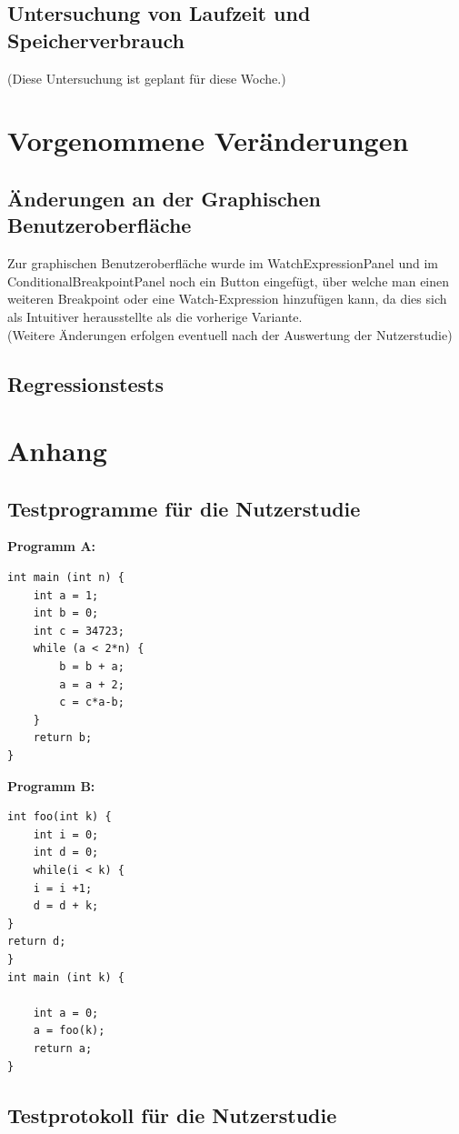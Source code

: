 \documentclass[parskip=full]{scrartcl}
\begin{document}
\subsection{Untersuchung von Laufzeit und Speicherverbrauch}
(Diese Untersuchung ist geplant für diese Woche.)

\section{Vorgenommene Veränderungen}

\subsection{Änderungen an der Graphischen Benutzeroberfläche}
Zur graphischen Benutzeroberfläche wurde im WatchExpressionPanel und im ConditionalBreakpointPanel noch ein Button eingefügt, über welche man einen weiteren Breakpoint oder eine Watch-Expression hinzufügen kann, da dies sich als Intuitiver herausstellte als die vorherige Variante. \\
(Weitere Änderungen erfolgen eventuell nach der Auswertung der Nutzerstudie)

\subsection{Regressionstests}

\newpage
\section{Anhang}
\subsection{Testprogramme für die Nutzerstudie}\label{code}
\textbf{Programm A:}
\begin{verbatim}
int main (int n) {
	int a = 1;
	int b = 0;
	int c = 34723;
	while (a < 2*n) {
		b = b + a;
		a = a + 2;
		c = c*a-b;
	}
	return b;
}
\end{verbatim}

\textbf{Programm B:}
\begin{verbatim}
int foo(int k) {
	int i = 0;
	int d = 0;
	while(i < k) {
	i = i +1;
	d = d + k;
}
return d;
}
int main (int k) {

	int a = 0;
	a = foo(k);
	return a;
}
\end{verbatim}

\subsection{Testprotokoll für die Nutzerstudie}\label{usertest}


\end{document}
